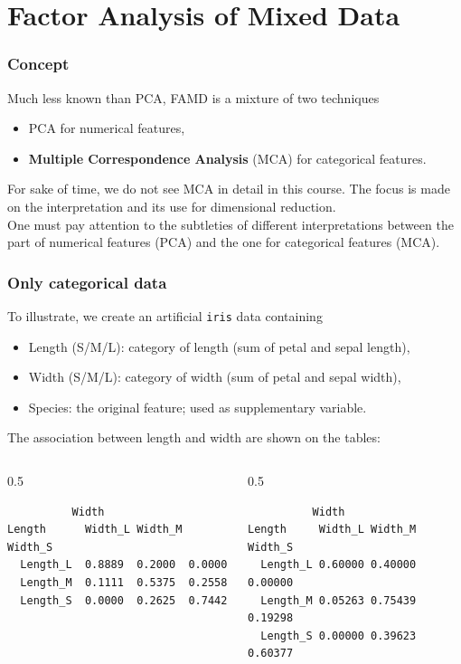 \section{Factor Analysis of Mixed Data}
\begin{frame}
\frametitle{Concept}
Much less known than PCA, FAMD is a mixture of two techniques
\begin{itemize}
\item PCA for numerical features,
\item {\bf Multiple Correspondence Analysis} (MCA) for categorical features.
\end{itemize}
For sake of time, we do not see MCA in detail in this course. The focus is made on the interpretation and its use for dimensional reduction. \\
\vspace{0.3cm}
One must pay attention to the subtleties of different interpretations between the part of numerical features (PCA) and the one for categorical features (MCA).
\end{frame}
\begin{frame}[fragile]
\frametitle{Only categorical data}
To illustrate, we create an artificial {\tt iris} data containing
\begin{itemize}
\item Length (S/M/L): category of length (sum of petal and sepal length),
\item Width (S/M/L): category of width (sum of petal and sepal width),
\item Species: the original feature; used as supplementary variable.
\end{itemize}
The association between length and width are shown on the tables:\\
\scriptsize
\begin{columns}
\begin{column}{0.5\linewidth}
\begin{verbatim}
          Width
Length      Width_L Width_M Width_S
  Length_L  0.8889  0.2000  0.0000
  Length_M  0.1111  0.5375  0.2558
  Length_S  0.0000  0.2625  0.7442
\end{verbatim}
\end{column}
\vrule
\hspace{0.2cm}
\begin{column}{0.5\linewidth}
\begin{verbatim}
          Width
Length     Width_L Width_M Width_S
  Length_L 0.60000 0.40000 0.00000
  Length_M 0.05263 0.75439 0.19298
  Length_S 0.00000 0.39623 0.60377
\end{verbatim}
\end{column}
\end{columns}
\normalsize
\end{frame}
